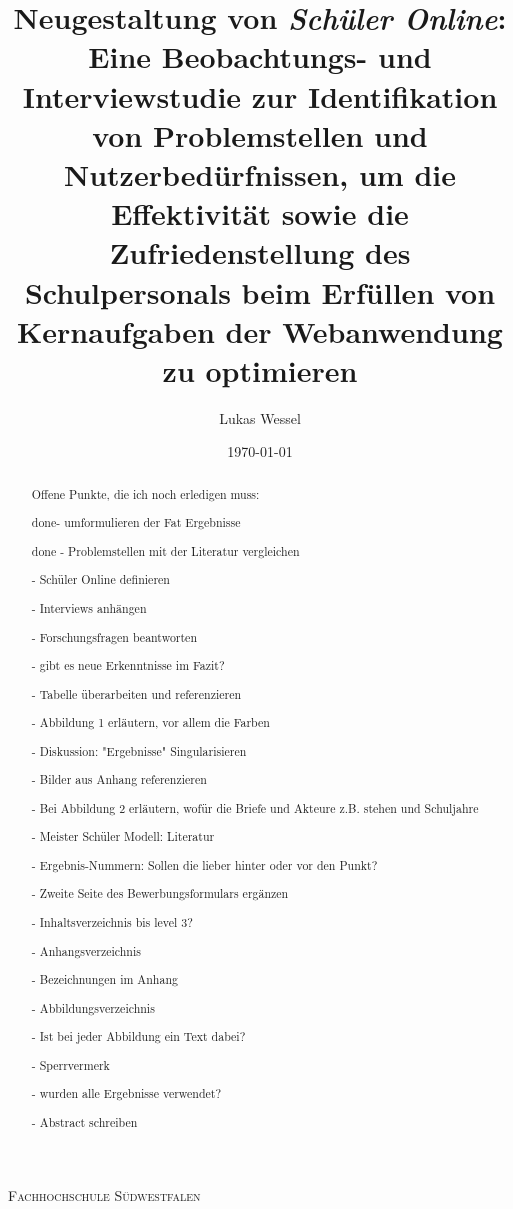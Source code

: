 \documentclass[pdftex,a4paper,abstracton,11pt,parskip=half,bibtotocnumbered]{scrartcl}
\title{Neugestaltung von \textit{Schüler Online}: Eine Beobachtungs- und Interviewstudie zur Identifikation von Problemstellen und Nutzerbedürfnissen, um die Effektivität sowie die Zufriedenstellung des Schulpersonals beim Erfüllen von Kernaufgaben der Webanwendung zu optimieren}
\author{Lukas Wessel}
\date{\today}
\begin{document}

\makeatletter
\begin{titlepage}
	\centering
	{\scshape\LARGE Fachhochschule Südwestfalen \par}
	\vspace{1cm}
	\vspace{1.5cm}
	{\huge\bfseries \@title\par}
	\vspace{3cm}
	{\Large \@author\par}
	\vspace{1cm}
	{\Large \@date\par}
	\vfill

	\raggedright
\end{titlepage}
\makeatother

\thispagestyle{empty}
\begin{abstract}
Offene Punkte, die ich noch erledigen muss:


done- umformulieren der Fat Ergebnisse 

done - Problemstellen mit der Literatur vergleichen

- Schüler Online definieren

- Interviews anhängen

- Forschungsfragen beantworten

- gibt es neue Erkenntnisse im Fazit?

- Tabelle überarbeiten und referenzieren

- Abbildung 1 erläutern, vor allem die Farben

- Diskussion: "Ergebnisse" Singularisieren 

- Bilder aus Anhang referenzieren

- Bei Abbildung 2 erläutern, wofür die Briefe und Akteure z.B. stehen und Schuljahre 

- Meister Schüler Modell: Literatur

- Ergebnis-Nummern: Sollen die lieber hinter oder vor den Punkt?

- Zweite Seite des Bewerbungsformulars ergänzen

- Inhaltsverzeichnis bis level 3?

- Anhangsverzeichnis

- Bezeichnungen im Anhang

- Abbildungsverzeichnis

- Ist bei jeder Abbildung ein Text dabei?

- Sperrvermerk

- wurden alle Ergebnisse verwendet?

- Abstract schreiben


\end{abstract}
\end{document}
